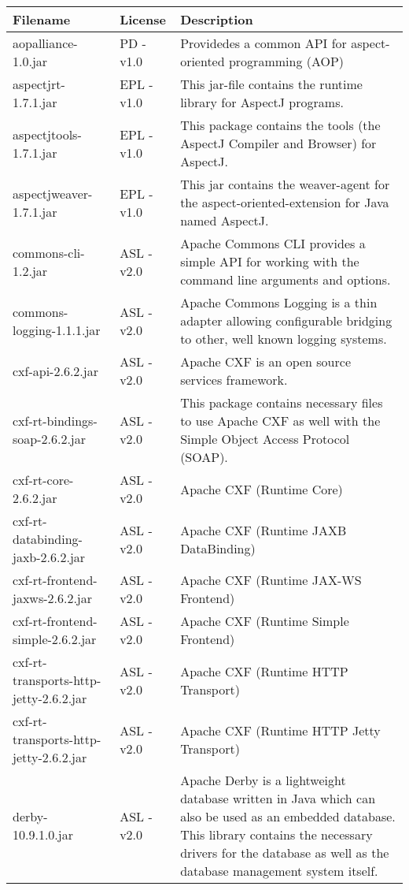 \begin{center}
\begin{longtable}{|p{}|p{}|p{}|}
\hline 
Filename & License & Description\\
\hline
\hline 
aopalliance-1.0.jar & PD - v1.0 & Providedes a common API for aspect-oriented programming (AOP)\\
\hline 
aspectjrt-1.7.1.jar & EPL - v1.0 & This jar-file contains the runtime library for AspectJ programs.\\
\hline 
aspectjtools-1.7.1.jar & EPL - v1.0 & This package contains the tools (the AspectJ Compiler and Browser) for AspectJ.\\
\hline 
aspectjweaver-1.7.1.jar & EPL - v1.0 & This jar contains the weaver-agent for the aspect-oriented-extension for Java named AspectJ.\\
\hline 
commons-cli-1.2.jar & ASL - v2.0 & Apache Commons CLI provides a simple API for working with the command line arguments and options.\\
\hline 
commons-logging-1.1.1.jar & ASL - v2.0 & Apache Commons Logging is a thin adapter allowing configurable bridging to other, well known logging systems.\\
\hline 
cxf-api-2.6.2.jar & ASL - v2.0 & Apache CXF is an open source services framework.\\
\hline 
cxf-rt-bindings-soap-2.6.2.jar & ASL - v2.0 & This package contains necessary files to use Apache CXF as well with the Simple Object Access Protocol (SOAP).\\
\hline 
cxf-rt-core-2.6.2.jar & ASL - v2.0 & Apache CXF (Runtime Core)\\
\hline 
cxf-rt-databinding-jaxb-2.6.2.jar & ASL - v2.0 & Apache CXF (Runtime JAXB DataBinding)\\
\hline 
cxf-rt-frontend-jaxws-2.6.2.jar & ASL - v2.0 & Apache CXF (Runtime JAX-WS Frontend)\\
\hline 
cxf-rt-frontend-simple-2.6.2.jar & ASL - v2.0 & Apache CXF (Runtime Simple Frontend)\\
\hline 
cxf-rt-transports-http-jetty-2.6.2.jar & ASL - v2.0 & Apache CXF (Runtime HTTP Transport)\\
\hline 
cxf-rt-transports-http-jetty-2.6.2.jar & ASL - v2.0 & Apache CXF (Runtime HTTP Jetty Transport)\\
\hline 
derby-10.9.1.0.jar & ASL - v2.0 & Apache Derby is a lightweight database written in Java which can also be used as an embedded database. This library contains the necessary drivers for the database as well as the database management system itself.\\

\end{longtable}
\end{center}
